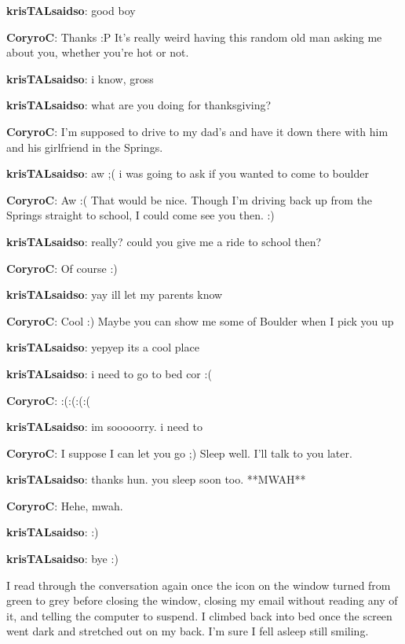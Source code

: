 \textbf{\color{red}krisTALsaidso}: good boy

\textbf{\color{blue}CoryroC}: Thanks :P  It's really weird having this random old man asking me about you, whether you're hot or not.

\textbf{\color{red}krisTALsaidso}: i know, gross

\textbf{\color{red}krisTALsaidso}: what are you doing for thanksgiving?

\textbf{\color{blue}CoryroC}: I'm supposed to drive to my dad's and have it down there with him and his girlfriend in the Springs.

\textbf{\color{red}krisTALsaidso}: aw ;( i was going to ask if you wanted to come to boulder

\textbf{\color{blue}CoryroC}: Aw :(  That would be nice.  Though I'm driving back up from the Springs straight to school, I could come see you then. :)

\textbf{\color{red}krisTALsaidso}: really?  could you give me a ride to school then?

\textbf{\color{blue}CoryroC}: Of course :)

\textbf{\color{red}krisTALsaidso}: yay ill let my parents know

\textbf{\color{blue}CoryroC}: Cool :)  Maybe you can show me some of Boulder when I pick you up

\textbf{\color{red}krisTALsaidso}: yepyep its a cool place

\textbf{\color{red}krisTALsaidso}: i need to go to bed cor :(

\textbf{\color{blue}CoryroC}: :(:(:(:(

\textbf{\color{red}krisTALsaidso}: im sooooorry.  i need to

\textbf{\color{blue}CoryroC}: I suppose I can let you go ;)  Sleep well.  I'll talk to you later.

\textbf{\color{red}krisTALsaidso}: thanks hun.  you sleep soon too.  **MWAH**

\textbf{\color{blue}CoryroC}: Hehe, mwah.

\textbf{\color{red}krisTALsaidso}: :)

\textbf{\color{red}krisTALsaidso}: bye :)

\vspace{1em}I read through the conversation again once the icon on the window turned from green to grey before closing the window, closing my email without reading any of it, and telling the computer to suspend.  I climbed back into bed once the screen went dark and stretched out on my back.  I'm sure I fell asleep still smiling.

